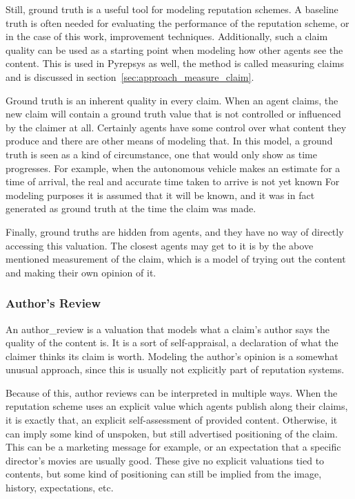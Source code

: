 \documentclass[%
    ]{\PathToTumTemplate/thesis/tum_thesis}
\begin{document}
Still, ground truth is a useful tool for modeling reputation schemes.
A baseline truth is often needed for evaluating the performance of the reputation scheme, or in the case of this work, improvement techniques.
Additionally, such a claim quality can be used as a starting point when modeling how other agents see the content.
This is used in Pyrepsys as well, the method is called measuring claims and is discussed in section~\ref{sec:approach_measure_claim}.

Ground truth is an inherent quality in every claim.
When an agent claims, the new claim will contain a ground truth value that is not controlled or influenced by the claimer at all.
Certainly agents have some control over what content they produce and there are other means of modeling that.
In this model, a ground truth is seen as a kind of circumstance, one that would only show as time progresses.
For example, when the autonomous vehicle makes an estimate for a time of arrival, the real and accurate time taken to arrive is not yet known
For modeling purposes it is assumed that it will be known, and it was in fact generated as ground truth at the time the claim was made.

Finally, ground truths are hidden from agents, and they have no way of directly accessing this valuation.
The closest agents may get to it is by the above mentioned measurement of the claim, which is a model of trying out the content and making their own opinion of it.

\subsubsection{Author's Review}\label{sec:approach_author_review}
An \gls{author_review} is a valuation that models what a claim's author says the quality of the content is.
It is a sort of self-appraisal, a declaration of what the claimer thinks its claim is worth.
Modeling the author's opinion is a somewhat unusual approach, since this is usually not explicitly part of reputation systems.

Because of this, author reviews can be interpreted in multiple ways.
When the reputation scheme uses an explicit value which agents publish along their claims, it is exactly that, an explicit self-assessment of provided content.
Otherwise, it can imply some kind of unspoken, but still advertised positioning of the claim.
This can be a marketing message for example, or an expectation that a specific director's movies are usually good.
These give no explicit valuations tied to contents, but some kind of positioning can still be implied from the image, history, expectations, etc.
\end{document}
